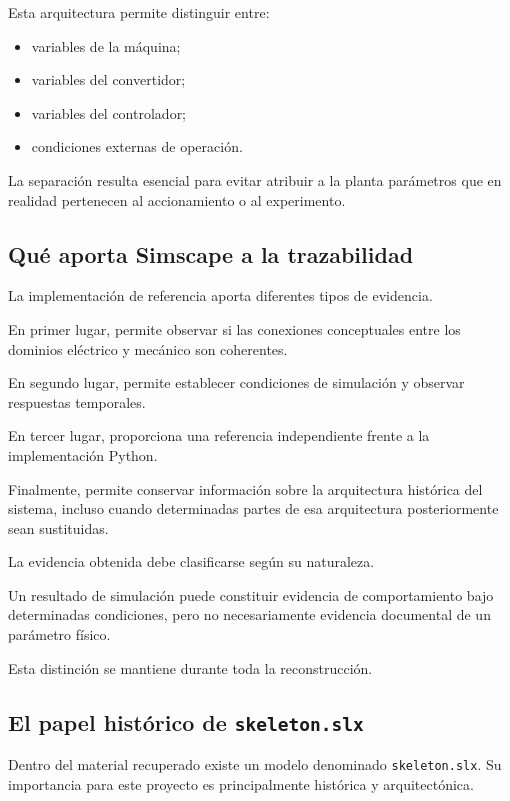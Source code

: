 Esta arquitectura permite distinguir entre:

\begin{itemize}
    \item variables de la máquina;
    \item variables del convertidor;
    \item variables del controlador;
    \item condiciones externas de operación.
\end{itemize}

La separación resulta esencial para evitar atribuir a la planta parámetros que en realidad pertenecen al accionamiento o al experimento.

\subsection{Qué aporta Simscape a la trazabilidad}

La implementación de referencia aporta diferentes tipos de evidencia.

En primer lugar, permite observar si las conexiones conceptuales entre los dominios eléctrico y mecánico son coherentes.

En segundo lugar, permite establecer condiciones de simulación y observar respuestas temporales.

En tercer lugar, proporciona una referencia independiente frente a la implementación Python.

Finalmente, permite conservar información sobre la arquitectura histórica del sistema, incluso cuando determinadas partes de esa arquitectura posteriormente sean sustituidas.

La evidencia obtenida debe clasificarse según su naturaleza.

Un resultado de simulación puede constituir evidencia de comportamiento bajo determinadas condiciones, pero no necesariamente evidencia documental de un parámetro físico.

Esta distinción se mantiene durante toda la reconstrucción.

\subsection{El papel histórico de \texttt{skeleton.slx}}

Dentro del material recuperado existe un modelo denominado \texttt{skeleton.slx}. Su importancia para este proyecto es principalmente histórica y arquitectónica.

